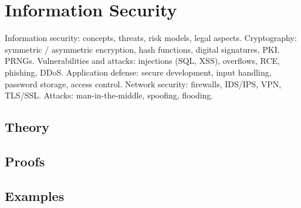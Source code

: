 
\section{Information Security}
\label{sec:2.3b.10-infosec}

\begin{ticket}
Information security: concepts, threats, risk models, legal aspects. Cryptography: symmetric / asymmetric encryption, hash functions, digital signatures, PKI. PRNGs. Vulnerabilities and attacks: injections (SQL, XSS), overflows, RCE, phishing, DDoS. Application defense: secure development, input handling, password storage, access control. Network security: firewalls, IDS/IPS, VPN, TLS/SSL. Attacks: man-in-the-middle, spoofing, flooding.
\end{ticket}

\subsection*{Theory}

\subsection*{Proofs}

\subsection*{Examples}
